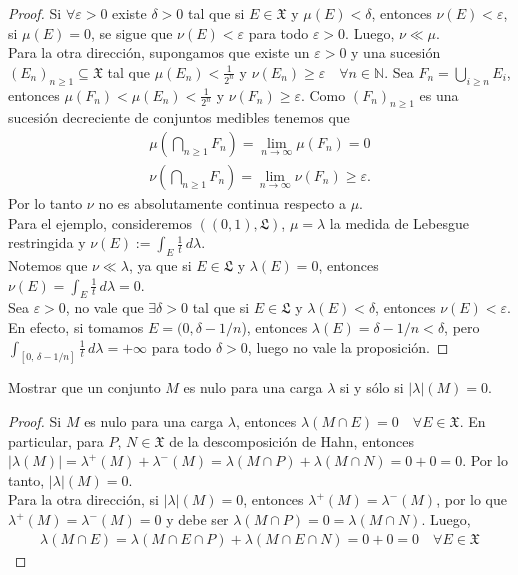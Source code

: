 \documentclass[12pt]{article}
\newenvironment{statement}[2][Ejercicio]{\begin{trivlist}
\item[\hskip \labelsep {\bfseries #1}\hskip \labelsep {\bfseries #2.}]}{\end{trivlist}}
\begin{document}
\begin{proof}
    Si $\forall \varepsilon > 0$ existe $\delta > 0$ tal que si $E \in \mathfrak{X}$ y $\mu(E) < \delta$, entonces $\nu(E) < \varepsilon$, si $\mu(E) = 0$, se sigue que $\nu(E) < \varepsilon$ para todo $\varepsilon > 0$. Luego, $\nu \ll \mu$. \\
    Para la otra dirección, supongamos que existe un $\varepsilon > 0$ y una sucesión $(E_n)_{n \geq 1} \subseteq \mathfrak{X}$ tal que $\mu(E_n) < \frac{1}{2^n}$ y $\nu(E_n) \geq \varepsilon \quad \forall n \in \mathbb{N}$. Sea
    $F_n = \bigcup_{i \geq n} E_i$, entonces $\mu(F_n) < \mu(E_n) < \frac{1}{2^n}$ y $\nu(F_n) \geq \varepsilon$. Como $(F_n)_{n \geq 1}$ es una sucesión decreciente de conjuntos medibles tenemos que \begin{align*}
        \mu \left (\bigcap_{n \geq 1} F_n \right) = \lim_{n \to \infty} \mu(F_n) = 0 \\
        \nu \left (\bigcap_{n \geq 1} F_n \right) = \lim_{n \to \infty} \nu(F_n) \geq \varepsilon.
    \end{align*}
    Por lo tanto $\nu$ no es absolutamente continua respecto a $\mu$. \\
    Para el ejemplo, consideremos $((0,1), \mathfrak{L})$, $\mu = \lambda$ la medida de Lebesgue restringida y $\nu(E) := \int_E \frac{1}{t} \, d\lambda$. \\
    Notemos que $\nu \ll \lambda$, ya que si $E \in \mathfrak{L}$ y $\lambda(E) = 0$, entonces $\nu(E) = \int_E \frac{1}{t} \, d\lambda = 0$. \\
    Sea $\varepsilon > 0$, no vale que $\exists \delta > 0$ tal que si $E \in \mathfrak{L}$ y $\lambda(E) < \delta$, entonces $\nu(E) < \varepsilon$. En efecto, si tomamos $E = (0, \delta - 1/n$), entonces $\lambda(E) = \delta - 1/n < \delta$, pero $\int_{[0\text{, } \delta - 1/n]} \frac{1}{t} \, d\lambda = +\infty$ para todo $\delta > 0$, luego no vale la proposición.
\end{proof}

\begin{statement}{3}
    Mostrar que un conjunto $M$ es nulo para una carga $\lambda$ si y sólo si $|\lambda|(M) = 0$.
\end{statement}

\begin{proof}
    Si $M$ es nulo para una carga $\lambda$, entonces $\lambda(M \cap E) = 0 \quad \forall E \in \mathfrak{X}$. En particular, para $P$, $N \in \mathfrak{X}$ de la descomposición de Hahn,
    entonces $|\lambda(M)| = \lambda^+(M) + \lambda^-(M) = \lambda(M \cap P) + \lambda(M \cap N) = 0 + 0 = 0$. Por lo tanto, $|\lambda|(M) = 0$. \\
    Para la otra dirección, si $|\lambda|(M) = 0$, entonces $\lambda^+(M) = \lambda^-(M)$, por lo que $\lambda^+(M) = \lambda^-(M) = 0$ y debe ser $\lambda(M \cap P) = 0 = \lambda(M \cap N)$. Luego, \begin{align*}
        \lambda(M \cap E) = \lambda(M \cap E \cap P) + \lambda(M \cap E \cap N) = 0 + 0 = 0 \quad \forall E \in \mathfrak{X}
    \end{align*}
\end{proof}
\end{document}
